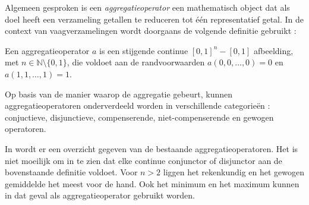 Algemeen gesproken is een \emph{aggregatieoperator} een mathematisch object dat als doel heeft
een verzameling getallen te reduceren tot \'e\'en representatief getal. In de context van 
vaagverzamelingen wordt doorgaans de volgende definitie gebruikt 
\cite{victor:aggregatieoperatoren}:
\begin{definitie}
Een aggregatieoperator $a$ is een stijgende continue $[0,1]^n - [0,1]$ afbeelding, 
met $n \in \mathbb{N} \setminus \{0,1\}$, die voldoet aan de randvoorwaarden $a(0,0,\ldots,0)=0$ en 
$a(1,1,\ldots,1)=1$.
\end{definitie}
\noindent
Op basis van de manier waarop de aggregatie gebeurt, kunnen aggregatieoperatoren onderverdeeld
worden in verschillende categorie\"en \cite{grabisch:fuzzy_aggregation_of_numerical_preferences}:
conjuctieve, disjunctieve, compenserende, niet-compenserende en gewogen operatoren.

In \cite{detyniecki:numerical_aggregation_operators} wordt er een overzicht gegeven van
de bestaande aggregatieoperatoren. Het is niet moeilijk om in te zien dat elke continue 
conjunctor of disjunctor aan de bovenstaande definitie voldoet. Voor $n > 2$ liggen het 
rekenkundig en het gewogen gemiddelde het meest voor de hand. Ook het minimum en het maximum
kunnen in dat geval als aggregatieoperator gebruikt worden.
